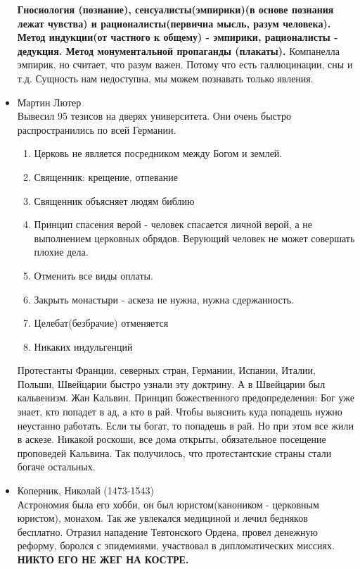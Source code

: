 \documentclass[a4paper,12pt]{report} %
\begin{document}
\begin{itemize}
  \textbf{Гносиология (познание), сенсуалисты(эмпирики)(в основе познания лежат чувства) и
    рационалисты(первична мысль, разум человека). Метод индукции(от
    частного к общему) - эмпирики, рационалисты - дедукция. Метод
    монументальной пропаганды (плакаты).
  }
  Компанелла эмпирик, но считает, что разум важен. Потому что есть
  галлюцинации, сны и т.д. Сущность нам недоступна, мы можем познавать
  только явления.
\item Мартин Лютер \\
  Вывесил 95 тезисов на дверях университета. Они очень быстро
  распространились по всей Германии.\\
  \begin{enumerate}
  \item Церковь не является посредником между Богом и землей.
  \item Священник: крещение, отпевание
  \item Священник объясняет людям библию
  \item Принцип спасения верой - человек спасается личной верой, а не
    выполнением церковных обрядов. Верующий человек не может совершать
    плохие дела.
  \item Отменить все виды оплаты.
  \item Закрыть монастыри - аскеза не нужна, нужна сдержанность.
  \item Целебат(безбрачие) отменяется
  \item Никаких индульгенций
  \end{enumerate}
  Протестанты Франции, северных стран, Германии, Испании, Италии,
  Польши, Швейцарии быстро узнали эту доктрину. А в Швейцарии был
  кальвенизм. Жан Кальвин. Принцип божественного предопределения: Бог уже
  знает, кто попадет в ад, а кто в рай. Чтобы выяснить куда попадешь
  нужно неустанно работать. Если ты богат, то попадешь в рай. Но при
  этом все жили в аскезе. Никакой роскоши, все дома открыты,
  обязательное посещение проповедей Кальвина. Так получилось, что
  протестантские страны стали богаче остальных.\\
\item Коперник, Николай (1473-1543)\\
  Астрономия была его хобби, он был юристом(каноником - церковным
  юристом), монахом. Так же увлекался медициной и лечил бедняков
  бесплатно. Отразил нападение Тевтонского Ордена, провел денежную
  реформу, боролся с эпидемиями, участвовал в дипломатических миссиях. \textbf{НИКТО ЕГО НЕ ЖЕГ НА КОСТРЕ.}\\

\end{itemize}
\end{document}
